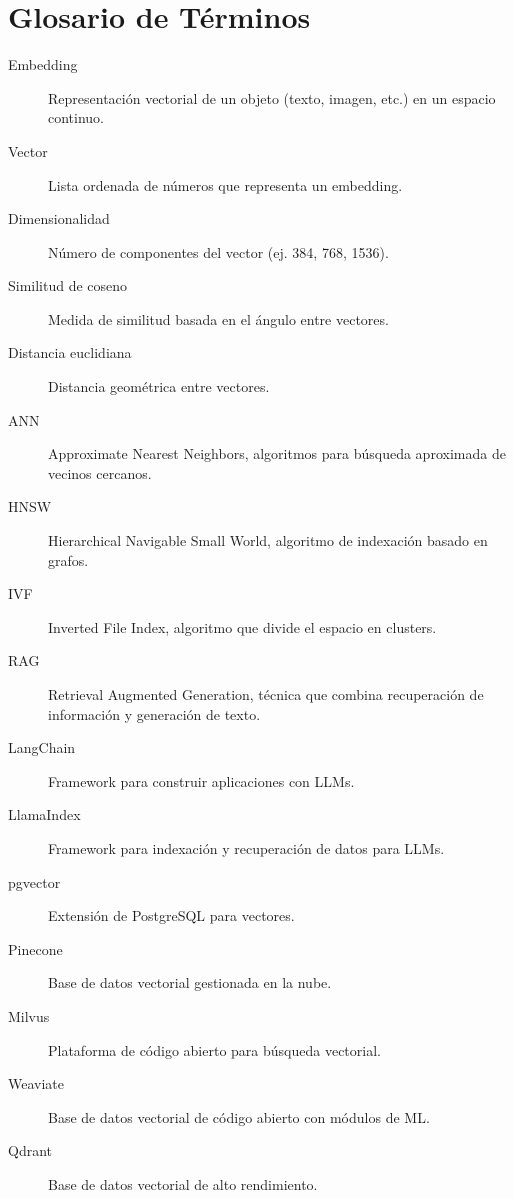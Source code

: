 \documentclass[12pt,a4paper,openany,oneside]{book}
\begin{document}
\chapter{Glosario de Términos}
\begin{description}
    \item[Embedding] Representación vectorial de un objeto (texto, imagen, etc.) en un espacio continuo.
    \item[Vector] Lista ordenada de números que representa un embedding.
    \item[Dimensionalidad] Número de componentes del vector (ej. 384, 768, 1536).
    \item[Similitud de coseno] Medida de similitud basada en el ángulo entre vectores.
    \item[Distancia euclidiana] Distancia geométrica entre vectores.
    \item[ANN] Approximate Nearest Neighbors, algoritmos para búsqueda aproximada de vecinos cercanos.
    \item[HNSW] Hierarchical Navigable Small World, algoritmo de indexación basado en grafos.
    \item[IVF] Inverted File Index, algoritmo que divide el espacio en clusters.
    \item[RAG] Retrieval Augmented Generation, técnica que combina recuperación de información y generación de texto.
    \item[LangChain] Framework para construir aplicaciones con LLMs.
    \item[LlamaIndex] Framework para indexación y recuperación de datos para LLMs.
    \item[pgvector] Extensión de PostgreSQL para vectores.
    \item[Pinecone] Base de datos vectorial gestionada en la nube.
    \item[Milvus] Plataforma de código abierto para búsqueda vectorial.
    \item[Weaviate] Base de datos vectorial de código abierto con módulos de ML.
    \item[Qdrant] Base de datos vectorial de alto rendimiento.
\end{description}
\end{document}
